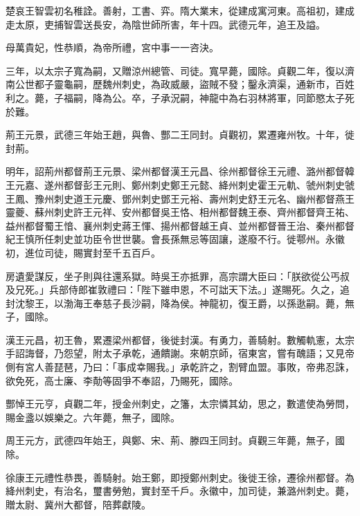 \begin{pinyinscope}
 楚哀王智雲初名稚詮。善射，工書、弈。隋大業末，從建成寓河東。高祖初，建成走太原，吏捕智雲送長安，為陰世師所害，年十四。武德元年，追王及謚。



 母萬貴妃，性恭順，為帝所禮，宮中事一一咨決。



 三年，以太宗子寬為嗣，又贈涼州總管、司徒。寬早薨，國除。貞觀二年，復以濟南公世都子靈龜嗣，歷魏州刺史，為政威嚴，盜賊不發；鑿永濟渠，通新市，百姓利之。薨，子福嗣，降為公。卒，子承況嗣，神龍中為右羽林將軍，同節愍太子死於難。



 荊王元景，武德三年始王趙，與魯、酆二王同封。貞觀初，累遷雍州牧。十年，徙封荊。



 明年，詔荊州都督荊王元景、梁州都督漢王元昌、徐州都督徐王元禮、潞州都督韓王元嘉、遂州都督彭王元則、鄭州刺史鄭王元懿、絳州刺史霍王元軌、虢州刺史虢王鳳、豫州刺史道王元慶、鄧州刺史鄧王元裕、壽州刺史舒王元名、幽州都督燕王靈夔、蘇州刺史許王元祥、安州都督吳王恪、相州都督魏王泰、齊州都督齊王祐、益州都督蜀王愔、襄州刺史蔣王惲、揚州都督越王貞、並州都督晉王治、秦州都督紀王慎所任刺史並功臣令世世襲。會長孫無忌等固讓，遂廢不行。徙鄠州。永徽初，進位司徒，賜實封至千五百戶。



 房遺愛謀反，坐子則與往還系獄。時吳王亦抵罪，高宗謂大臣曰：「朕欲從公丐叔及兄死。」兵部侍郎崔敦禮曰：「陛下雖申恩，不可詘天下法。」遂賜死。久之，追封沈黎王，以渤海王奉慈子長沙嗣，降為侯。神龍初，復王爵，以孫逖嗣。薨，無子，國除。



 漢王元昌，初王魯，累遷梁州都督，後徙封漢。有勇力，善騎射。數觸軌憲，太宗手詔誨督，乃怨望，附太子承乾，通饋謝。來朝京師，宿東宮，嘗有醜語；又見帝側有宮人善琵琶，乃曰：「事成幸賜我。」承乾許之，割臂血盟。事敗，帝弗忍誅，欲免死，高士廉、李勣等固爭不奉詔，乃賜死，國除。



 酆悼王元亨，貞觀二年，授金州刺史，之籓，太宗憐其幼，思之，數遣使為勞問，賜金盞以娛樂之。六年薨，無子，國除。



 周王元方，武德四年始王，與鄭、宋、荊、滕四王同封。貞觀三年薨，無子，國除。



 徐康王元禮性恭畏，善騎射。始王鄭，即授鄭州刺史。後徙王徐，遷徐州都督。為絳州刺史，有治名，璽書勞勉，實封至千戶。永徽中，加司徒，兼潞州刺史。薨，贈太尉、冀州大都督，陪葬獻陵。




\end{pinyinscope}
